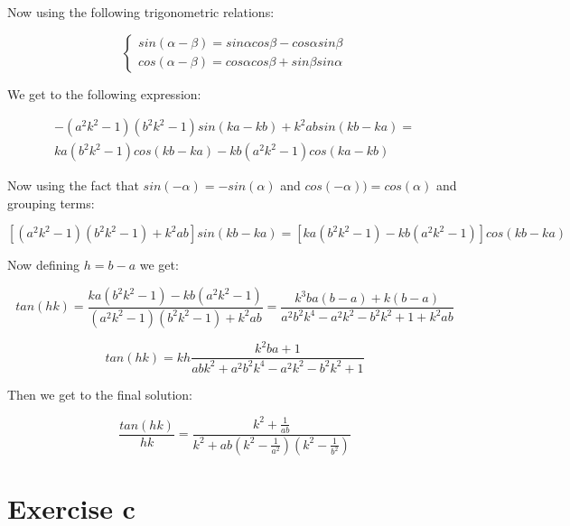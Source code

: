 \documentclass[a4paper,12pt]{article}
\begin{document}
Now using the following trigonometric relations: 

\begin{equation}
    \begin{cases}
    sin(\alpha - \beta) = sin\alpha cos \beta - cos \alpha sin \beta\\
    cos(\alpha - \beta) = cos \alpha cos \beta + sin \beta sin \alpha
  \end{cases}
\end{equation}

We get to the following expression: 

\begin{small}
\begin{equation}
\begin{split}
-(a^2k^2-1)(b^2k^2-1)sin(ka-kb) + k^2ab sin(kb - ka) = \\ ka(b^2k^2-1)cos(kb - ka) - kb(a^2k^2 -1 )cos (ka - kb)
\end{split}
\end{equation}
\end{small}

Now using the fact that $sin(- \alpha) = - sin (\alpha) $ and $cos(- \alpha) ) = cos(\alpha)$ and grouping terms: 

\begin{equation}
\left[(a^2k^2-1)(b^2k^2-1) + k^2ab \right]sin(kb-ka) = \left[ka(b^2k^2-1) - kb(a^2k^2 -1) \right]cos(kb - ka)
\end{equation}

Now defining $h = b-a$ we get: 

\begin{equation}
tan(hk) = \frac{ka(b^2k^2-1) - kb(a^2k^2 -1)}{(a^2k^2-1)(b^2k^2-1) + k^2ab} = \frac{k^3ba(b-a) + k(b-a)}{a^2b^2k^4 -a^2k^2 -b^2k^2 +1 +k^2ab}
\end{equation}

\begin{equation}
tan(hk) =kh \frac{k^2ba +1}{abk^2+a^2b^2k^4 -a^2k^2-b^2k^2+1} 
\end{equation}

Then we get to the final solution: 

\begin{equation}
\frac{tan(hk)}{hk} = \frac{k^2 + \frac{1}{ab}}{k^2 + ab\left(k^2 - \frac{1}{a^2} \right)\left(k^2 - \frac{1}{b^2} \right)}
\label{eq:finalsol}
\end{equation}

\section{Exercise c}
\end{document}
